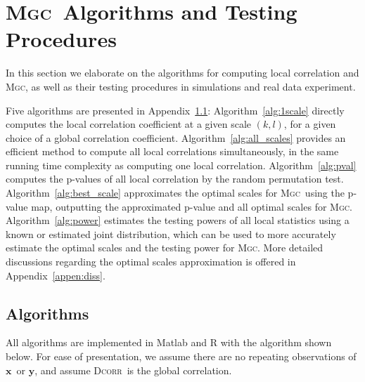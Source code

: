 \documentclass[11pt]{article}
\providecommand{\sct}[1]{{\normalfont\textsc{#1}}}
\providecommand{\mb}[1]{\boldsymbol{#1}}
\newcommand{\Mgc}{\sct{Mgc}}
\newcommand{\Dcorr}{\sct{Dcorr}}
\newcommand{\mbx}{\ensuremath{\mb{x}}}
\newcommand{\mby}{\ensuremath{\mb{y}}}
\begin{document}

\section{\Mgc~Algorithms and Testing Procedures}
\label{appen:tests}
In this section we elaborate on the algorithms for computing local correlation and \Mgc, as well as their testing procedures in simulations and real data experiment.

Five algorithms are presented in Appendix~\ref{appen:algorithms}: Algorithm~\ref{alg:1scale} directly computes  the local correlation coefficient at a given scale $(k,l)$, for a given choice of a global correlation coefficient.
Algorithm~\ref{alg:all_scales} provides an efficient method to compute all local correlations simultaneously, in the same running time complexity as computing one local correlation. Algorithm~\ref{alg:pval} computes the p-values of all local correlation by the random permutation test. 
Algorithm~\ref{alg:best_scale} approximates the optimal scales for \Mgc~using the p-value map, 
outputting the approximated p-value and all optimal scales for \Mgc. 
Algorithm~\ref{alg:power} estimates the testing powers of all local statistics using a known or estimated joint distribution, which can be used to more accurately estimate the optimal scales and the testing power for \Mgc. More detailed discussions regarding the optimal scales approximation is offered in Appendix~\ref{appen:diss}.

\subsection{Algorithms}
\label{appen:algorithms}
All algorithms are implemented in Matlab and R with the algorithm shown below. For ease of presentation, we assume there are no repeating observations of \mbx~or \mby, and assume \Dcorr~is the global correlation.
\end{document}
